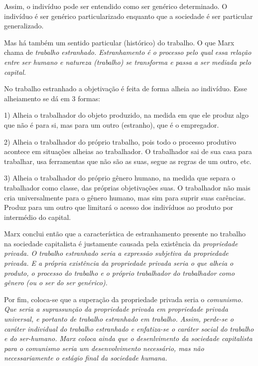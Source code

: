 \documentclass[12pt]{article}
\begin{document}
Assim, o indivíduo pode ser entendido como ser genérico determinado.
O indivíduo é ser genérico particularizado enquanto que a sociedade é ser particular generalizado.

Mas há também um sentido particular (histórico) do trabalho.
O que Marx chama de \em trabalho estranhado\em.
\em Estranhamento \em é o processo pelo qual essa relação entre ser humano e natureza (trabalho) se transforma e passa a ser mediada pelo capital.

No trabalho estranhado a objetivação é feita de forma alheia ao indivíduo.
Esse alheiamento se dá em 3 formas:

1) Alheia o trabalhador do objeto produzido, na medida em que ele produz algo que não é para si, mas para um outro (estranho), que é o empregador.

2) Alheia o trabalhador do próprio trabalho, pois todo o processo produtivo acontece em situações alheias ao trabalhador.
O trabalhador sai de sua casa para trabalhar, usa ferramentas que não são as suas, segue as regras de um outro, etc.

3) Alheia o trabalhador do próprio gênero humano, na medida que separa o trabalhador como classe, das próprias objetivações suas. O trabalhador não mais cria universalmente para o gênero humano, mas sim para suprir suas carências. Produz para um outro que limitará o acesso dos indivíduos ao produto por intermédio do capital.

Marx conclui então que a característica de estranhamento presente no trabalho na sociedade capitalista é justamente causada pela existência da \em propriedade privada\em.
O trabalho estranhado seria a expressão subjetiva da propriedade privada.
E a própria existência da propriedade privada seria o que alheia o produto, o processo do trabalho e o próprio trabalhador do trabalhador como gênero (ou o ser do ser genérico).

Por fim, coloca-se que a superação da propriedade privada seria o \em comunismo\em.
Que seria a suprassunção da propriedade privada em propriedade privada universal, e portanto de trabalho estranhado em trabalho.
Assim, perde-se o caráter individual do trabalho estranhado e enfatiza-se o caráter social do trabalho e do ser-humano. Marx coloca ainda que o desenlvimento da sociedade capitalista para o comunismo seria um desenvolvimento necessário, mas não necessariamente o estágio final da sociedade humana.
\end{document}
